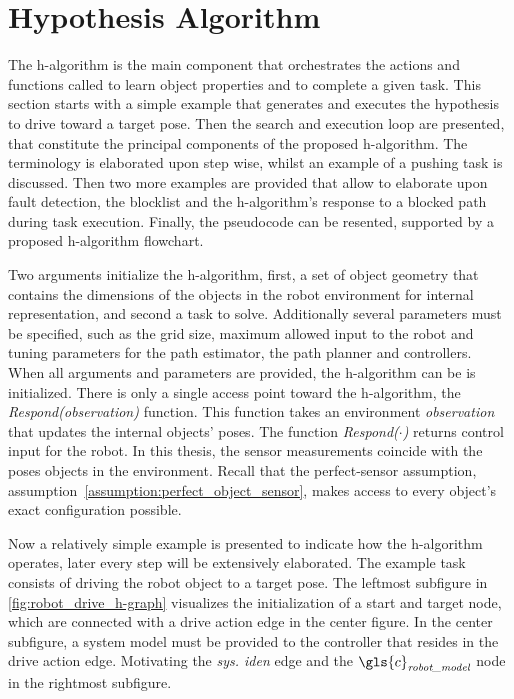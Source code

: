 \section{Hypothesis Algorithm}%
\label{sec:h-algorithm}
The \ac{h-algorithm} is the main component that orchestrates the actions and functions called to learn object properties and to complete a given task. This section starts with a simple example that generates and executes the hypothesis to drive toward a target pose. Then the search and execution loop are presented, that constitute the principal components of the proposed \ac{h-algorithm}. The terminology is elaborated upon step wise, whilst an example of a pushing task is discussed. Then two more examples are provided that allow to elaborate upon fault detection, the blocklist and the \ac{h-algorithm}'s response to a blocked path during task execution. Finally, the pseudocode can be resented, supported by a proposed \ac{h-algorithm} flowchart.\bs

Two arguments initialize the \ac{h-algorithm}, first, a set of object geometry that contains the dimensions of the objects in the robot environment for internal representation, and second a task to solve. Additionally several parameters must be specified, such as the grid size, maximum allowed input to the robot and tuning parameters for the path estimator, the path planner and controllers. When all arguments and parameters are provided, the \ac{h-algorithm} can be is initialized. There is only a single access point toward the \ac{h-algorithm}, the \textit{Respond(observation)} function. This function takes an environment \textit{observation} that updates the internal objects' poses. The function \textit{Respond($\cdot$)} returns control input for the robot. In this thesis, the sensor measurements coincide with the poses objects in the environment. Recall that the perfect-sensor assumption, assumption~\ref{assumption:perfect_object_sensor}, makes access to every object's exact configuration possible.\bs

Now a relatively simple example is presented to indicate how the \ac{h-algorithm} operates, later every step will be extensively elaborated. The example task consists of driving the robot object to a target pose. The leftmost subfigure in \cref{fig:robot_drive_h-graph} visualizes the initialization of a start and target node, which are connected with a drive action edge in the center figure. In the center subfigure, a system model must be provided to the controller that resides in the drive action edge. Motivating the \textit{sys. iden} edge and the $\gls{c}_\textit{robot\_model}$ node in the rightmost subfigure.\bs

